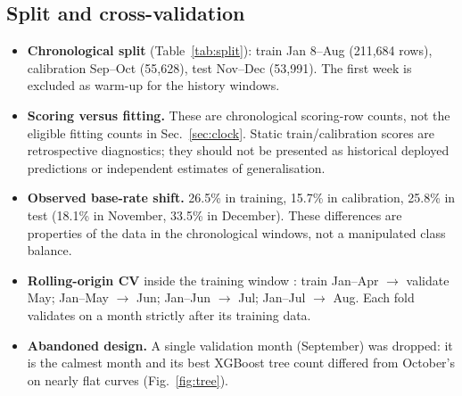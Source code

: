 \documentclass[conference]{IEEEtran}
\begin{document}
\subsection{Split and cross-validation}
\begin{itemize}
\item \textbf{Chronological split} (Table~\ref{tab:split}): train Jan 8--Aug (211{,}684 rows), calibration Sep--Oct (55{,}628), test Nov--Dec (53{,}991). The first week is excluded as warm-up for the history windows.
\item \textbf{Scoring versus fitting.} These are chronological scoring-row counts, not the eligible fitting counts in Sec.~\ref{sec:clock}. Static train/calibration scores are retrospective diagnostics; they should not be presented as historical deployed predictions or independent estimates of generalisation.
\item \textbf{Observed base-rate shift.} 26.5\% in training, 15.7\% in calibration, 25.8\% in test (18.1\% in November, 33.5\% in December). These differences are properties of the data in the chronological windows, not a manipulated class balance.
\item \textbf{Rolling-origin CV} inside the training window \cite{tashman2000,bergmeir2012cv}: train Jan--Apr $\to$ validate May; Jan--May $\to$ Jun; Jan--Jun $\to$ Jul; Jan--Jul $\to$ Aug. Each fold validates on a month strictly after its training data.
\item \textbf{Abandoned design.} A single validation month (September) was dropped: it is the calmest month and its best XGBoost tree count differed from October's on nearly flat curves (Fig.~\ref{fig:tree}).
\end{itemize}
\end{document}
